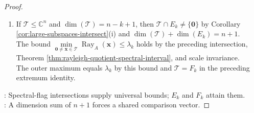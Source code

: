 \begin{theorem}
\begin{proof}
\begin{enumerate}[label=(\roman*)]
\item If $\mathcal{T}\leq\mathbb{C}^n$ and $\dim(\mathcal{T})=n-k+1$, then $\mathcal{T}\cap E_k\neq\{\mathbf{0}\}$ by Corollary \ref{cor:large-subspaces-intersect}(i) and $\dim(\mathcal{T})+\dim(E_k)=n+1$.\\
The bound $\min\limits_{\mathbf{0}\neq\mathbf{x}\in\mathcal{T}}\operatorname{Ray}_A(\mathbf{x})\leq\lambda_k$ holds by the preceding intersection, Theorem \ref{thm:rayleigh-quotient-spectral-interval}, and scale invariance.\\
The outer maximum equals $\lambda_k$ by this bound and $\mathcal{T}=F_k$ in the preceding extremum identity.
\end{enumerate}
: Spectral-flag intersections supply universal bounds; $E_k$ and $F_k$ attain them.\\
: A dimension sum of $n+1$ forces a shared comparison vector.
\end{proof}
\end{theorem}
